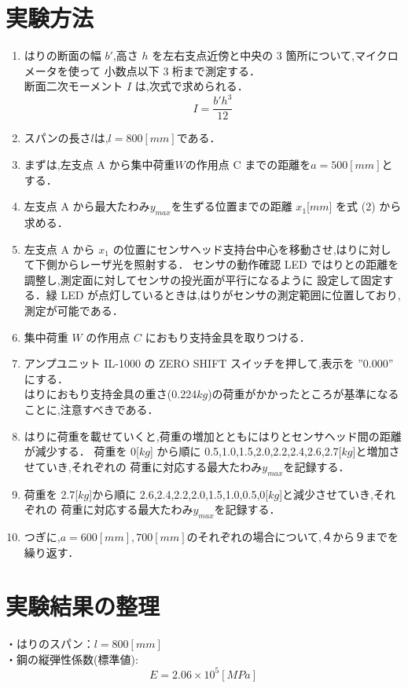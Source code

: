 \documentclass[a4paper,11pt]{jsarticle}
\begin{document}
\section{実験方法}
\begin{enumerate}
  \item はりの断面の幅 $b'$,高さ $h$ を左右支点近傍と中央の 3 箇所について,マイクロメータを使って
  小数点以下 3 桁まで測定する．\\
  \quad 断面二次モーメント $I$ は,次式で求められる．
  \begin{equation}
    I = {\dfrac{b'h^3}{12}}
  \end{equation}
  \item スパンの長さ$ l $は,$l= 800[mm] $である．
  \item まずは,左支点 A から集中荷重$ W $の作用点 C までの距離を$a = 500[mm] $とする．
  \item 左支点 A から最大たわみ$y_{max}$を生ずる位置までの距離 $x_1$[$mm$] を式 (2) から求める．
  \item 左支点 A から $x_1$ の位置にセンサヘッド支持台中心を移動させ,はりに対して下側からレーザ光を照射する．
  センサの動作確認 LED ではりとの距離を調整し,測定面に対してセンサの投光面が平行になるように
  設定して固定する．緑 LED が点灯しているときは,はりがセンサの測定範囲に位置しており,測定が可能である．
  \item  集中荷重 $W$ の作用点 $C$ におもり支持金具を取りつける．
  \item アンプユニット IL-1000 の ZERO SHIFT スイッチを押して,表示を ”0.000” にする．\\
  はりにおもり支持金具の重さ(0.224$kg$)の荷重がかかったところが基準になることに,注意すべきである．
  \item はりに荷重を載せていくと,荷重の増加とともにはりとセンサヘッド間の距離が減少する．
  荷重を 0[$kg$] から順に 0.5,1.0,1.5,2.0,2.2,2.4,2.6,2.7[$kg$]と増加させていき,それぞれの
  荷重に対応する最大たわみ$y_{max}$を記録する．
  \item 荷重を 2.7[$kg$]から順に 2.6,2.4,2.2,2.0,1.5,1.0,0.5,0[$kg$]と減少させていき,それぞれの
  荷重に対応する最大たわみ$y_{max}$を記録する．
  \item つぎに,$a= 600[mm],700[mm]$のそれぞれの場合について,４から９までを繰り返す．
\end{enumerate}

\section{実験結果の整理}
・はりのスパン：$l = 800[mm]$\\
\quad・鋼の縦弾性係数(標準値):
\begin{equation} 
  E = 2.06 \times 10^5 [MPa] 
\end{equation}
\end{document}
